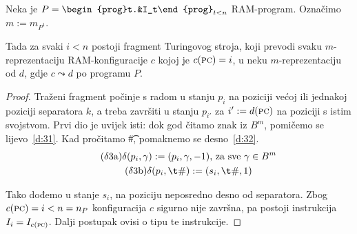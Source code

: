 \begin{propozicija}[{name=[{treći fragment transpiliranog stroja, izvršavanje instrukcija}]}]\label{prop:gadgets}
    Neka je $P=\begin{prog}t.&I_t\end{prog}_{t<n}$ RAM-program. Označimo $m:=m_{P^1}$.

        Tada za svaki $i<n$ postoji fragment Turingovog stroja, koji prevodi svaku $m$-reprezentaciju RAM-konfiguracije $c$ kojoj je $c(\textsc{pc})=i$, u neku $m$-reprezentaciju od $d$, gdje $c\leadsto d$ po programu $P$.
\end{propozicija}
\begin{proof}
Traženi fragment počinje s radom u stanju $p_i$ na poziciji većoj ili jednakoj poziciji separatora $k$, a treba završiti u stanju $p_{i'}$ za $i':=d(\textsc{pc})$ na poziciji s istim svojstvom. Prvi dio je uvijek isti: dok god čitamo znak iz $B^m$, pomičemo se lijevo~\eqref{d:31}. Kad pročitamo \t\#, pomaknemo se desno~\eqref{d:32}. 
\begin{gather*}
\label{d:31}\tag{$\delta$3a}
    \delta(p_i,\gamma):=(p_i,\gamma,-1)\text{, za sve }\gamma\in B^m\\
\label{d:32}\tag{$\delta$3b}
    \delta(p_i,\t\#):=(s_i,\t\#,1)
\end{gather*}

Tako dođemo u stanje $s_i$, na poziciju neposredno desno od separatora. Zbog $c(\textsc{pc})=i<n=n_P$ konfiguracija $c$ sigurno nije završna, pa postoji instrukcija $I_i=I_{c(\textsc{pc})}$. Dalji postupak ovisi o tipu te instrukcije.


\end{proof}

